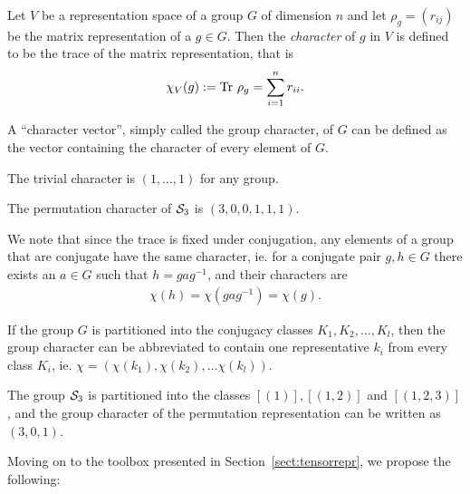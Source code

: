 \begin{definition}\label{def:char}
	Let $V$ be a representation space of a group $G$ of dimension $n$ and let $\rho_g = (r_{ij})$ be the matrix representation of a $g \in G$. Then the \emph{character} of $g$ in $V$ is defined to be the trace of the matrix representation, that is 
	\begin{align*}
		\chi_V(g) := \text{Tr } \rho_g = \sum_{i=1}^{n} r_{ii}.
	\end{align*}
\end{definition}


\begin{notation}
	A ``character vector'', simply called the group character, of $G$ can be defined as the vector containing the character of every element of $G$.
\end{notation}

\begin{example}
	The trivial character is $(1, \dots, 1)$ for any group.
\end{example}

\begin{example}
	The permutation character of $\mathcal{S}_3$ is $(3, 0, 0, 1, 1, 1)$.
\end{example}

\begin{remark}
	We note that since the trace is fixed under conjugation, any elements of a group that are conjugate have the same character, ie. for a conjugate pair $g,h \in G$ there exists an $a \in G$ such that $h = gag^{-1}$, and their characters are
	\begin{align*}
		\chi(h) = \chi(gag^{-1}) = \chi(g).
	\end{align*}
\end{remark}

\begin{notation}
	If the group $G$ is partitioned into the conjugacy classes $K_1, K_2, \dots, K_l$, then the group character can be abbreviated to contain one representative $k_i$ from every class $K_i$, ie. $\chi= (\chi(k_1), \chi(k_2), \dots \chi(k_l))$.
\end{notation}

\begin{example}
	The group $\mathcal{S}_3$ is partitioned into the classes $[(1)], [(1,2)]$ and $[(1,2,3)]$, and the group character of the permutation representation can be written as $(3,0,1)$.
\end{example}

Moving on to the toolbox presented in Section~\ref{sect:tensorrepr}, we propose the following:

